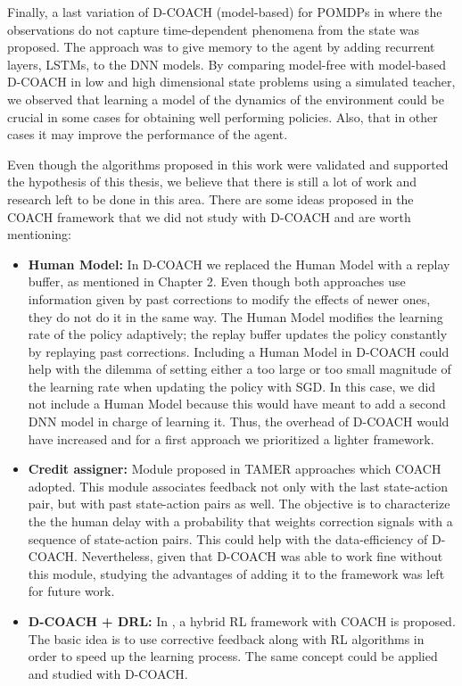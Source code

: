 \begin{conclusion}
Finally, a last variation of D-COACH (model-based) for POMDPs in where the observations do not capture time-dependent phenomena from the state was proposed. The approach was to give memory to the agent by adding recurrent layers, LSTMs, to the DNN models. By comparing model-free with model-based D-COACH in low and high dimensional state problems using a simulated teacher, we observed that learning a model of the dynamics of the environment could be crucial in some cases for obtaining well performing policies. Also, that in other cases it may improve the performance of the agent. 

Even though the algorithms proposed in this work were validated and supported the hypothesis of this thesis, we believe that there is still a lot of work and research left to be done in this area. There are some ideas proposed in the COACH framework that we did not study with D-COACH and are worth mentioning:

\begin{itemize}
    \item \textbf{Human Model:} In D-COACH we replaced the Human Model with a replay buffer, as mentioned in Chapter 2. Even though both approaches use information given by past corrections to modify the effects of newer ones, they do not do it in the same way. The Human Model modifies the learning rate of the policy adaptively; the replay buffer updates the policy constantly by replaying past corrections. Including a Human Model in D-COACH could help with the dilemma of setting either a too large or too small magnitude of the learning rate when updating the policy with SGD. In this case, we did not include a Human Model because this would have meant to add a second DNN model in charge of learning it. Thus, the overhead of D-COACH would have increased and for a first approach we prioritized a lighter framework.
    \item \textbf{Credit assigner:} Module proposed in TAMER approaches \cite{Knox:2009:ISA:1597735.1597738} which COACH adopted. This module associates feedback not only with the last state-action pair, but with past state-action pairs as well. The objective is to characterize the the human delay with a probability that weights correction signals with a sequence of state-action pairs. This could help with the data-efficiency of D-COACH. Nevertheless, given that D-COACH was able to work fine without this module, studying the advantages of adding it to the framework was left for future work. 
    \item \textbf{D-COACH + DRL:} In \cite{celemin2018fast}, a hybrid RL framework with COACH is proposed. The basic idea is to use corrective feedback along with RL algorithms in order to speed up the learning process. The same concept could be applied and studied with D-COACH. 
\end{itemize}


\end{conclusion}
